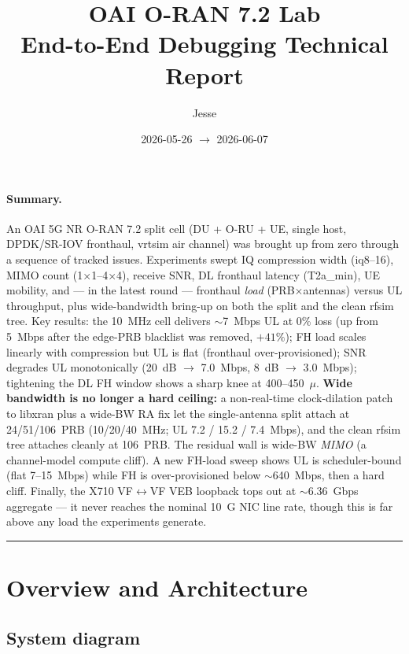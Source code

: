 \documentclass[11pt,a4paper]{article}
\title{\textbf{OAI O-RAN 7.2 Lab\\[4pt]End-to-End Debugging Technical Report}}
\author{Jesse}
\date{2026-05-26 $\rightarrow$ 2026-06-07}
\newcommand{\us}{\ensuremath{\mu}\text{s}}
\begin{document}
\maketitle

\paragraph{Summary.}
An OAI 5G NR O-RAN 7.2 split cell (DU + O-RU + UE, single host, DPDK/SR-IOV fronthaul,
vrtsim air channel) was brought up from zero through a sequence of tracked issues. Experiments
swept IQ compression width (iq8--16), MIMO count (1$\times$1--4$\times$4), receive SNR,
DL fronthaul latency (T2a\_min), UE mobility, and --- in the latest round --- fronthaul
\emph{load} (PRB$\times$antennas) versus UL throughput, plus wide-bandwidth bring-up on both
the split and the clean rfsim tree. Key results: the 10~MHz cell delivers $\sim$7~Mbps UL at
0\% loss (up from 5~Mbps after the edge-PRB blacklist was removed, $+41\%$); FH load scales
linearly with compression but UL is flat (fronthaul over-provisioned); SNR degrades UL
monotonically (20~dB $\rightarrow$ 7.0~Mbps, 8~dB $\rightarrow$ 3.0~Mbps); tightening the DL
FH window shows a sharp knee at 400--450~\us. \textbf{Wide bandwidth is no longer a hard
ceiling:} a non-real-time clock-dilation patch to libxran plus a wide-BW RA fix let the
single-antenna split attach at 24/51/106~PRB (10/20/40~MHz; UL 7.2 / 15.2 / 7.4~Mbps), and
the clean rfsim tree attaches cleanly at 106~PRB. The residual wall is wide-BW \emph{MIMO}
(a channel-model compute cliff). A new FH-load sweep shows UL is scheduler-bound (flat
7--15~Mbps) while FH is over-provisioned below $\sim$640~Mbps, then a hard cliff. Finally, the
X710 VF$\leftrightarrow$VF VEB loopback tops out at $\sim$6.36~Gbps aggregate --- it never
reaches the nominal 10~G NIC line rate, though this is far above any load the experiments
generate.

\tableofcontents
\bigskip\hrule\bigskip

\section{Overview and Architecture}

\subsection{System diagram}
\end{document}
